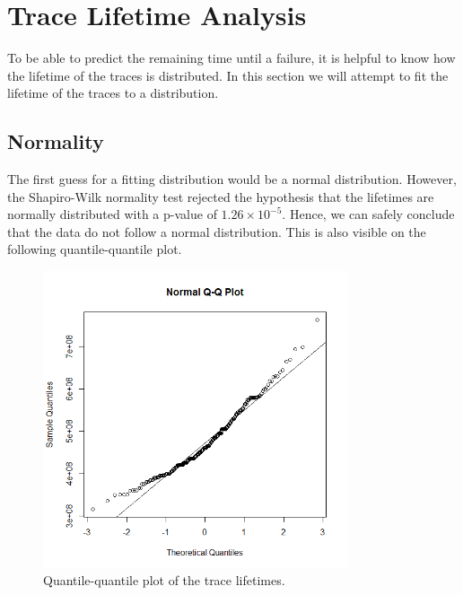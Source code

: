 \section{Trace Lifetime Analysis}
To be able to predict the remaining time until a failure, it is helpful to know how the lifetime of the traces is distributed. In this section we will attempt to fit the lifetime of the traces to a distribution.

\subsection{Normality}
The first guess for a fitting distribution would be a normal distribution. However, the Shapiro-Wilk normality test rejected the hypothesis that the lifetimes are normally distributed with a p-value of $1.26\times 10^{-5}$. Hence, we can safely conclude that the data do not follow a normal distribution. This is also visible on the following quantile-quantile plot.
\begin{figure}[H]
\centering
\includegraphics[width=0.8\textwidth]{Plots/QQPlot.png}
\caption{Quantile-quantile plot of the trace lifetimes.}
\end{figure}

